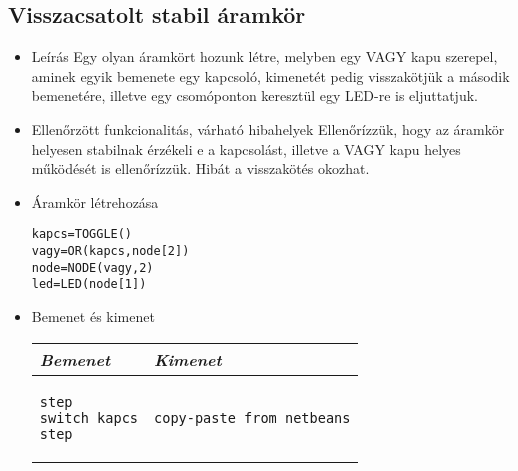 \subsection{Visszacsatolt stabil áramkör}
\begin{itemize}
\item Leírás\newline
Egy olyan áramkört hozunk létre, melyben egy VAGY kapu szerepel, aminek egyik bemenete egy kapcsoló, kimenetét pedig visszakötjük a második bemenetére, illetve egy csomóponton keresztül egy LED-re is eljuttatjuk.
\item Ellenőrzött funkcionalitás, várható hibahelyek\newline
Ellenőrízzük, hogy az áramkör helyesen stabilnak érzékeli e a kapcsolást, illetve a VAGY kapu helyes működését is ellenőrízzük. Hibát a visszakötés okozhat.

\item Áramkör létrehozása

\begin{verbatim}
kapcs=TOGGLE()
vagy=OR(kapcs,node[2])
node=NODE(vagy,2)
led=LED(node[1])
\end{verbatim}

\item Bemenet és kimenet\newline

\begin{tabular}{|p{5cm}|p{5cm}|} 
\hline 
\textit{Bemenet} & \textit{Kimenet} \\ \hline
\begin{verbatim}
step
switch kapcs
step
\end{verbatim}
& 
\begin{verbatim}
copy-paste from netbeans
\end{verbatim}
\\ \hline
\end{tabular}

\end{itemize}


